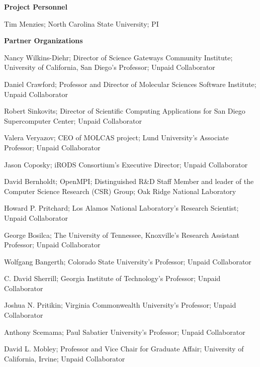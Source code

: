
\vspace*{\parskip}
\vspace{5mm}
\noindent \textbf{Project Personnel} 
\begin{enumerate*}
\item Tim Menzies; North Carolina State University; PI
\end{enumerate*}

\noindent \textbf{Partner Organizations}

\begin{enumerate*}
\item Nancy Wilkins-Diehr; Director of Science Gateways Community Institute; University of California, San Diego's Professor; Unpaid Collaborator
\item Daniel Crawford; Professor and Director of Molecular Sciences Software Institute; Unpaid Collaborator
\item Robert Sinkovits; Director of Scientific Computing Applications for San Diego Supercomputer Center; Unpaid Collaborator
\item Valera Veryazov; CEO of MOLCAS project; Lund University's Associate Professor; Unpaid Collaborator
\item Jason Coposky; iRODS Consortium's Executive Director; Unpaid Collaborator
\item David Bernholdt; OpenMPI; Distinguished R\&D Staff Member and leader of the Computer Science Research (CSR) Group; Oak Ridge National Laboratory
\item Howard P. Pritchard; Los Alamos National Laboratory's Research Scientist; Unpaid Collaborator
\item George Bosilca; The University of Tennessee, Knoxville's Research Assistant Professor; Unpaid Collaborator
\item Wolfgang Bangerth; Colorado State University's Professor; Unpaid Collaborator
\item C. David Sherrill; Georgia Institute of Technology's Professor; Unpaid Collaborator
\item Joshua N. Pritikin; Virginia Commonwealth University's Professor; Unpaid Collaborator
\item Anthony Scemama; Paul Sabatier University's Professor; Unpaid Collaborator
\item David L. Mobley; Professor and Vice Chair for Graduate Affair; University of California, Irvine; Unpaid Collaborator
\end{enumerate*}

